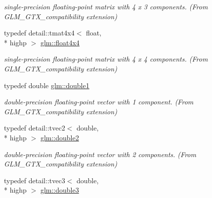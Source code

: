\begin{DoxyCompactItemize}
\begin{DoxyCompactList}\small\item\em single-\/precision floating-\/point matrix with 4 x 3 components. (From G\-L\-M\-\_\-\-G\-T\-X\-\_\-compatibility extension) \end{DoxyCompactList}\item 
\hypertarget{group__gtx__compatibility_ga1f48a19e35b3640cf3d509041f7a800b}{typedef detail\-::tmat4x4$<$ float, \\*
highp $>$ \hyperlink{group__gtx__compatibility_ga1f48a19e35b3640cf3d509041f7a800b}{glm\-::float4x4}}\label{group__gtx__compatibility_ga1f48a19e35b3640cf3d509041f7a800b}

\begin{DoxyCompactList}\small\item\em single-\/precision floating-\/point matrix with 4 x 4 components. (From G\-L\-M\-\_\-\-G\-T\-X\-\_\-compatibility extension) \end{DoxyCompactList}\item 
\hypertarget{group__gtx__compatibility_gab8b88350212cea916857cb2f49b8a29f}{typedef double \hyperlink{group__gtx__compatibility_gab8b88350212cea916857cb2f49b8a29f}{glm\-::double1}}\label{group__gtx__compatibility_gab8b88350212cea916857cb2f49b8a29f}

\begin{DoxyCompactList}\small\item\em double-\/precision floating-\/point vector with 1 component. (From G\-L\-M\-\_\-\-G\-T\-X\-\_\-compatibility extension) \end{DoxyCompactList}\item 
\hypertarget{group__gtx__compatibility_ga227d30a4fa630c9e3fb6c7ea87250c62}{typedef detail\-::tvec2$<$ double, \\*
highp $>$ \hyperlink{group__gtx__compatibility_ga227d30a4fa630c9e3fb6c7ea87250c62}{glm\-::double2}}\label{group__gtx__compatibility_ga227d30a4fa630c9e3fb6c7ea87250c62}

\begin{DoxyCompactList}\small\item\em double-\/precision floating-\/point vector with 2 components. (From G\-L\-M\-\_\-\-G\-T\-X\-\_\-compatibility extension) \end{DoxyCompactList}\item 
\hypertarget{group__gtx__compatibility_ga3b94d4a19ca0272cad6e025fc5150d06}{typedef detail\-::tvec3$<$ double, \\*
highp $>$ \hyperlink{group__gtx__compatibility_ga3b94d4a19ca0272cad6e025fc5150d06}{glm\-::double3}}\label{group__gtx__compatibility_ga3b94d4a19ca0272cad6e025fc5150d06}


\end{DoxyCompactItemize}
